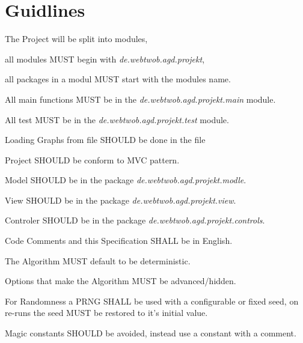 \section{Guidlines}

\newcommand{\basemodule}[1][]{\textit{de.webtwob.agd.projekt#1}}

\begin{list}{-}{}
\item The Project will be split into modules,

all modules MUST begin with \basemodule,

all packages in a modul MUST start with the modules name.

\item All main functions MUST be in the \basemodule[.main] module.

\item All test MUST be in the \basemodule[.test] module.

\item Loading Graphs from file SHOULD be done in the file 

\item Project SHOULD be conform to MVC pattern.

\item Model SHOULD be in the package \basemodule[.modle].

\item View SHOULD be in the package \basemodule[.view].

\item Controler SHOULD be in the package \basemodule[.controls].

\item Code Comments and this Specification SHALL be in English.

\item The Algorithm MUST default to be deterministic.

\item Options that make the Algorithm MUST be advanced/hidden.

\item For Randomness a PRNG SHALL be used with a configurable or fixed seed,
on re-runs the seed MUST be restored to it's initial value.

\item Magic constants SHOULD be avoided, instead use a constant with a comment.
\end{list}

